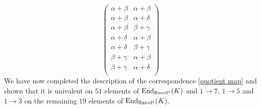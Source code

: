 \documentclass[12pt]{article}
\def\End{{\rm End}}
\def\B{{\mathbb B}}
\def\End{{\mbox{End}}}
\def\b2{{\rm \B mod^{\mathfrak s}}}
\begin{document}
$$
\left(
\begin{array}{cc}
 \alpha +\beta  & \alpha +\beta  \\
 \alpha +\beta  & \alpha +\delta  \\
 \alpha +\beta  & \beta +\gamma  \\
 \alpha +\delta  & \alpha +\beta  \\
 \alpha +\delta  & \beta +\gamma  \\
 \beta +\gamma  & \alpha +\beta  \\
 \beta +\gamma  & \alpha +\delta  \\
\end{array}
\right)
$$
We have now completed the description of the correspondence \eqref{quotient map} and shown that it is univalent on $51$ elements of $\End_\b2(K)$ and $1\to 7$, $1\to 5$ and $1\to 3$ on the remaining $19$ elements of $\End_\b2(K)$.  
\end{document}
